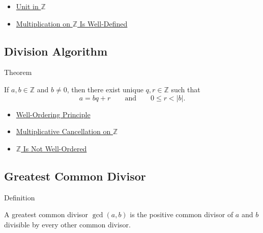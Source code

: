 \begin{dependencies}
\begin{itemize}
  \item \hyperref[def:unit-in-z]{Unit in $\mathbb{Z}$}
  \item \hyperref[thm:multiplication-on-z-well-defined]{Multiplication on $\mathbb{Z}$ Is Well-Defined}
\end{itemize}
\end{dependencies}

\subsection*{Division Algorithm}

\begin{theorembox}{Theorem}
\begin{theorem}
\label{thm:division-algorithm-on-z}
If $a,b\in\mathbb{Z}$ and $b\ne0$, then there exist unique
$q,r\in\mathbb{Z}$ such that
\[
a=bq+r
\qquad\text{and}\qquad
0\le r<|b|.
\]
\end{theorem}
\end{theorembox}

\begin{dependencies}
\begin{itemize}
  \item \hyperref[thm:well-ordering-principle]{Well-Ordering Principle}
  \item \hyperref[cor:multiplicative-cancellation-on-z]{Multiplicative Cancellation on $\mathbb{Z}$}
  \item \hyperref[thm:z-is-not-well-ordered]{$\mathbb{Z}$ Is Not Well-Ordered}
\end{itemize}
\end{dependencies}

\subsection*{Greatest Common Divisor}

\begin{definitionbox}{Definition}
\begin{definition}
\label{def:greatest-common-divisor-in-z}
A greatest common divisor $\gcd(a,b)$ is the positive common divisor of
$a$ and $b$ divisible by every other common divisor.
\end{definition}
\end{definitionbox}

